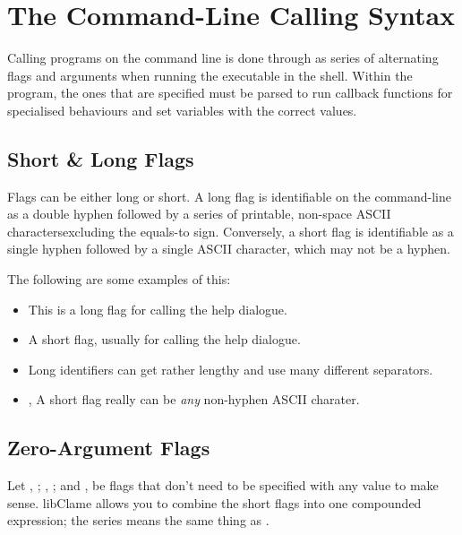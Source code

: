 \section{The Command-Line Calling Syntax}

Calling programs on the command line is done through as series of alternating flags and arguments when running the executable in the shell. Within the program, the ones that are specified must be parsed to run callback functions for specialised behaviours and set variables with the correct values.

\subsection{Short \& Long Flags}

Flags can be either long or short. A long flag is identifiable on the command-line as a double hyphen followed by a series of printable, non-space ASCII characters\footnotemark excluding the equals-to sign. Conversely, a short flag is identifiable as a single hyphen followed by a single ASCII character, which may not be a hyphen.

The following are some examples of this:
\begin{itemize}
	\item {} This is a long flag for calling the help dialogue.
	\item {} A short flag, usually for calling the help dialogue.
	\item {} Long identifiers can get rather lengthy and use many different separators.
	\item {},  A short flag really can be \emph{any} non-hyphen ASCII charater.
\end{itemize}

\subsection{Zero-Argument Flags}

Let , ; , ; and ,  be flags that don't need to be specified with any value to make sense. libClame allows you to combine the short flags into one compounded expression; the series  means the same thing as .

